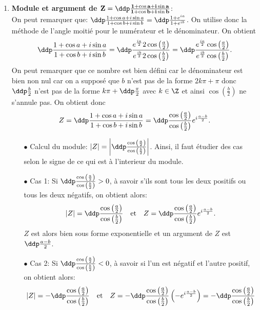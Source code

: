 
\begin{correction}   \;
\begin{enumerate}
\item \textbf{Module et argument de $\mathbf{Z=\ddp\frac{1+\cos{a}+i\sin{a}  }{ 1+\cos{b}+i\sin{b}  }}$}:\\
On peut remarquer que: $\ddp\frac{1+\cos{a}+i\sin{a}  }{ 1+\cos{b}+i\sin{b}  }= \ddp\frac{ 1+e^{ia}  }{1+e^{ib}}$. On utilise donc la m\'ethode de l'angle moiti\'e pour le num\'erateur et le d\'enominateur. On obtient
$$\ddp\frac{1+\cos{a}+i\sin{a}  }{ 1+\cos{b}+i\sin{b}  }= \ddp\frac{ e^{\frac{ia}{2}}   2\cos{\left( \frac{a}{2}\right)}  }{ e^{\frac{ib}{2}}   2\cos{\left( \frac{b}{2}\right)}   }=\ddp\frac{ e^{\frac{ia}{2}}   \cos{\left( \frac{a}{2}\right)}  }{ e^{\frac{ib}{2}}   \cos{\left( \frac{b}{2}\right)}   }.$$
On peut remarquer que ce nombre est bien d\'efini car le d\'enominateur est bien non nul car on a suppos\'e que $b$ n'est pas de la forme $2k\pi+\pi$ donc $\ddp\frac{b}{2}$ n'est pas de la forme $k\pi+\ddp\frac{\pi}{2}$ avec $k\in\Z$ et ainsi $\cos{\left( \frac{b}{2}\right)} $ ne s'annule pas. On obtient donc
$$Z=\ddp\frac{1+\cos{a}+i\sin{a}  }{ 1+\cos{b}+i\sin{b}  }=\ddp\frac{ \cos{\left( \frac{a}{2}\right)}  }{   \cos{\left( \frac{b}{2}\right)}  } e^{i\frac{a-b}{2}}.$$
\begin{itemize}
\item[$\bullet$] Calcul du module: $|Z|= \left| \ddp\frac{ \cos{\left( \frac{a}{2}\right)}  }{   \cos{\left( \frac{b}{2}\right)}  }   \right|$. Ainsi, il faut \'etudier des cas selon le signe de ce qui est \`{a} l'interieur du module.
\item[$\bullet$] Cas 1: Si $ \ddp\frac{ \cos{\left( \frac{a}{2}\right)}  }{   \cos{\left( \frac{b}{2}\right)}  } >0$, \`{a} savoir s'ils sont tous les deux positifs ou tous les deux n\'egatifs, on obtient alors:
$$|Z|=\ddp\frac{ \cos{\left( \frac{a}{2}\right)}  }{   \cos{\left( \frac{b}{2}\right)}  } \quad \hbox{et}\quad Z=\ddp\frac{ \cos{\left( \frac{a}{2}\right)}  }{   \cos{\left( \frac{b}{2}\right)}  } e^{i\frac{a-b}{2}}.$$
$Z$ est alors bien sous forme exponentielle et un argument de $Z$ est $\ddp\frac{a-b}{2}$.
\item[$\bullet$] Cas 2: Si $ \ddp\frac{ \cos{\left( \frac{a}{2}\right)}  }{   \cos{\left( \frac{b}{2}\right)}  } <0$, \`{a} savoir si l'un est n\'egatif et l'autre positif, on obtient alors:
$$|Z|=-\ddp\frac{ \cos{\left( \frac{a}{2}\right)}  }{   \cos{\left( \frac{b}{2}\right)}  } \quad \hbox{et}\quad Z=-\ddp\frac{ \cos{\left( \frac{a}{2}\right)}  }{   \cos{\left( \frac{b}{2}\right)}  } \left(-e^{i\frac{a-b}{2}}\right)=-\ddp\frac{ \cos{\left( \frac{a}{2}\right)}  }{   \cos{\left( \frac{b}{2}\right)}  } 
$$
\end{itemize}
\end{enumerate}
\end{correction}

